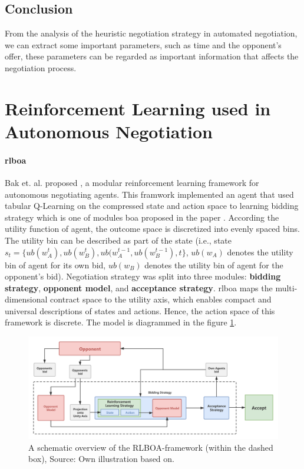 \subsection{Conclusion}
From the analysis of the heuristic negotiation strategy in automated negotiation, we can extract some important parameters, such as time and the opponent's offer, these parameters can be regarded as important information that affects the negotiation process.

\section{Reinforcement Learning used in Autonomous Negotiation}

\paragraph{\gls{rlboa}} Bak et. al. proposed \parencite{Bakker2019RLBOAAM}, a modular reinforcement learning framework for autonomous negotiating agents. This framwork implemented an agent that used tabular Q-Learning on the compressed state and action space to learning bidding strategy which is one of modules \gls{boa} proposed in the paper \parencite{Baarslag2014}. According the utility function of agent, the outcome space is discretized into evenly spaced bins. The utility bin can be described as part of the state (i.e., state $s_t = \{ ub(w_{A}^t), ub(w_{B}^t), ub(w_{A}^{t-1}, ub(w_{B}^{t-1}), t\}$, $ub(w_{A})$ denotes the utility bin of agent for its own bid, $ub(w_{B})$ denotes the utility bin of agent for the opponent's bid). Negotiation strategy was split into three modules: \textbf{bidding strategy}, \textbf{opponent model}, and \textbf{acceptance strategy}. \gls{rlboa} maps the multi-dimensional contract space to the utility axis, which enables compact and universal descriptions of states and actions. Hence, the action space of this framework is discrete. The model is diagrammed in the figure \ref{fig:rlboa}.

\begin{figure}[htbp]
\centering
\includegraphics[width=1.0\textwidth]{./images/rlboa.png}
\caption{A schematic overview of the RLBOA-framework (within the dashed box), Source: Own illustration based
on\parencite{Bakker2019RLBOAAM}.}
\label{fig:rlboa}
\end{figure}


